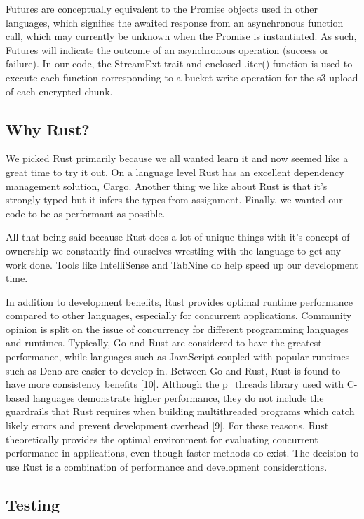 \documentclass[conference]{IEEEtran}
\begin{document}
Futures are conceptually equivalent to the Promise objects used in other 
languages, which signifies the awaited response from an asynchronous function call, which may currently be unknown when the Promise
is instantiated. As such, Futures will indicate the outcome of an asynchronous operation (success or failure). In our code, the StreamExt 
trait and enclosed .iter() function is used to execute each function corresponding to a bucket write operation for the s3 upload of each 
encrypted chunk.


\subsection{Why Rust?}

We picked Rust primarily because we all wanted learn it and now seemed like a great time to try it out.
On a language level Rust has an excellent dependency management solution, Cargo.
Another thing we like about Rust is that it's strongly typed but it infers the types from assignment.
Finally, we wanted our code to be as performant as possible.

All that being said because Rust does a lot of unique things with it's concept of ownership we constantly
find ourselves wrestling with the language to get any work done.
Tools like IntelliSense and TabNine do help speed up our development time.

In addition to development benefits, Rust provides optimal runtime performance compared to other languages,
especially for concurrent applications. Community opinion is split on the issue of concurrency for different
programming languages and runtimes. Typically, Go and Rust are considered to have the greatest performance,
while languages such as JavaScript coupled with popular runtimes such as Deno are easier to develop in. Between
Go and Rust, Rust is found to have more consistency benefits [10]. Although the p\_threads library used with C-based
languages demonstrate higher performance, they do not include the guardrails that Rust requires when building
multithreaded programs which catch likely errors and prevent development overhead [9]. For these reasons, Rust theoretically 
provides the optimal environment for evaluating concurrent performance in applications, even though faster methods do 
exist. The decision to use Rust is a combination of performance and development considerations.

\subsection{Testing}
\end{document}
